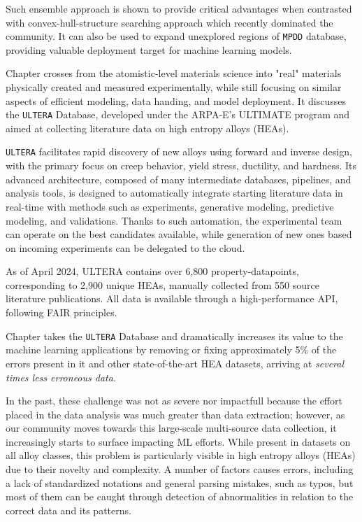 Such ensemble approach is shown to provide critical advantages when contrasted with convex-hull-structure searching approach which recently dominated the community. It can also be used to expand unexplored regions of \texttt{MPDD} database, providing valuable deployment target for machine learning models.


Chapter  crosses from the atomistic-level materials science into "real" materials physically created and measured experimentally, while still focusing on similar aspects of efficient modeling, data handing, and model deployment. It discusses the \texttt{ULTERA} Database, developed under the ARPA-E's ULTIMATE program and aimed at collecting literature data on high entropy alloys (HEAs).

\texttt{ULTERA} facilitates rapid discovery of new alloys using forward and inverse design, with the primary focus on creep behavior, yield stress, ductility, and hardness. Its advanced architecture, composed of many intermediate databases, pipelines, and analysis tools, is designed to automatically integrate starting literature data in real-time with methods such as experiments, generative modeling, predictive modeling, and validations. Thanks to such automation, the experimental team can operate on the best candidates available, while generation of new ones based on incoming experiments can be delegated to the cloud.

As of April 2024, ULTERA contains over 6,800 property-datapoints, corresponding to 2,900 unique HEAs, manually collected from 550 source literature publications. All data is available through a high-performance API, following FAIR principles.


Chapter  takes the \texttt{ULTERA} Database and dramatically increases its value to the machine learning applications by removing or fixing approximately 5\% of the errors present in it and other state-of-the-art HEA datasets, arriving at \emph{several times less erroneous data}.

In the past, these challenge was not as severe nor impactfull because the effort placed in the data analysis was much greater than data extraction; however, as our community moves towards this large-scale multi-source data collection, it increasingly starts to surface impacting ML efforts. While present in datasets on all alloy classes, this problem is particularly visible in high entropy alloys (HEAs) due to their novelty and complexity. A number of factors causes errors, including a lack of standardized notations and general parsing mistakes, such as typos, but most of them can be caught through detection of abnormalities in relation to the correct data and its patterns.

